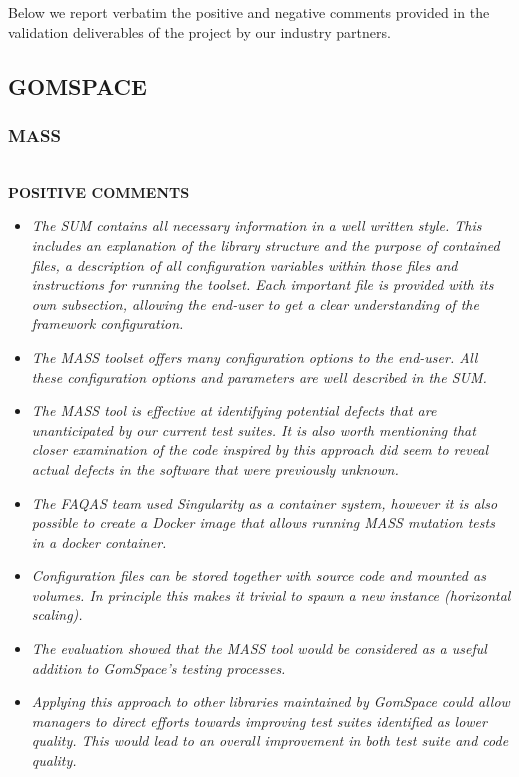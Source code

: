 Below we report verbatim the positive and negative comments provided in the validation deliverables of the project by our industry partners.

\subsection{GOMSPACE}

\subsubsection{MASS}\ \\

\textbf{POSITIVE COMMENTS}

\begin{itemize}
\item \emph{The SUM contains all necessary information in a well written style. This includes an explanation of the library structure and the purpose of contained files, a description of all configuration variables within those files and instructions for running the toolset. Each important file is provided with its own subsection, allowing the end-user to get a clear understanding of the framework configuration.}



\item \emph{The MASS toolset offers many configuration options to the end-user. All these configuration options and parameters are well described in the SUM. }

\item \emph{The MASS tool is effective at identifying potential defects that are unanticipated by our current test suites. It is also worth mentioning that closer examination of the code inspired by this approach did seem to reveal actual defects in the software that were previously unknown.}


\item \emph{The FAQAS team used Singularity as a container system, however it is also possible to create a Docker image that allows running MASS mutation tests in a docker container.}

\item \emph{Configuration files can be stored together with source code and mounted as volumes. In principle this makes it trivial to spawn a new instance (horizontal scaling).}

\item \emph{The evaluation showed that the MASS tool would be considered as a useful addition to GomSpace’s testing processes.}

\item \emph{Applying this approach to other libraries maintained by GomSpace could allow managers to direct efforts towards improving test suites identified as lower quality. This would lead to an overall improvement in both test suite and code quality.}

\end{itemize}

